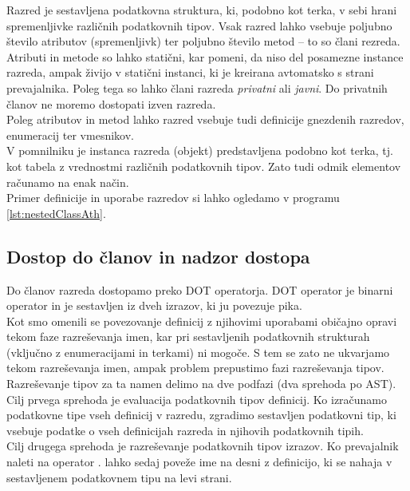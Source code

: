 \documentclass[a4paper, 12p]{book}
\begin{document}
Razred je sestavljena podatkovna struktura, ki, podobno kot terka, v sebi hrani spremenljivke različnih podatkovnih tipov. Vsak razred lahko vsebuje poljubno število atributov (spremenljivk) ter poljubno število metod – to so člani rezreda. \\
\indent Atributi in metode so lahko statični, kar pomeni, da niso del posamezne instance razreda, ampak živijo v statični instanci, ki je kreirana avtomatsko s strani prevajalnika. Poleg tega so lahko člani razreda \textit{privatni} ali \textit{javni}. Do privatnih članov ne moremo dostopati izven razreda. \\
\indent Poleg atributov in metod lahko razred vsebuje tudi definicije gnezdenih razredov, enumeracij ter vmesnikov.\\
\indent V pomnilniku je instanca razreda (objekt) predstavljena podobno kot terka, tj. kot tabela z vrednostmi različnih podatkovnih tipov. Zato tudi odmik elementov računamo na enak način. \\
\indent Primer definicije in uporabe razredov si lahko ogledamo v programu \ref{lst:nestedClassAth}.

\subsection{Dostop do članov in nadzor dostopa}

Do članov razreda dostopamo preko DOT operatorja. DOT operator je binarni operator in je sestavljen iz dveh izrazov, ki ju povezuje pika. \\
\indent Kot smo omenili se povezovanje definicij z njihovimi uporabami običajno opravi tekom faze razreševanja imen, kar pri sestavljenih podatkovnih strukturah (vključno z enumeracijami in terkami) ni mogoče. S tem se zato ne ukvarjamo tekom razreševanja imen, ampak problem prepustimo fazi razreševanja tipov. \\
\indent Razreševanje tipov za ta namen delimo na dve podfazi (dva sprehoda po AST). Cilj prvega sprehoda je evaluacija podatkovnih tipov definicij. Ko izračunamo podatkovne tipe vseh definicij v razredu, zgradimo sestavljen podatkovni tip, ki vsebuje podatke o vseh definicijah razreda in njihovih podatkovnih tipih. \\ 
\indent Cilj drugega sprehoda je razreševanje podatkovnih tipov izrazov. Ko prevajalnik naleti na operator {\ttfamily .} lahko sedaj poveže ime na desni z definicijo, ki se nahaja v sestavljenem podatkovnem tipu na levi strani.\\\\
\end{document}
